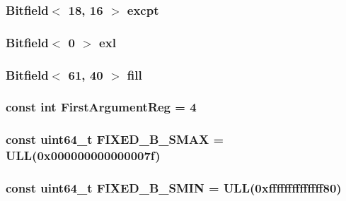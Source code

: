 \label{namespaceMipsISA_af82a5b4961c19deb1c31c3e7caf815f0}
\hypertarget{namespaceMipsISA_a58c4c329e72fc28d6945a399bb0ccbc3}{
\subsubsection[{excpt}]{\setlength{\rightskip}{0pt plus 5cm}Bitfield$<$ 18, 16 $>$ {\bf excpt}}}
\label{namespaceMipsISA_a58c4c329e72fc28d6945a399bb0ccbc3}
\hypertarget{namespaceMipsISA_a6e38f8e879fe70aca77ab90389d39e97}{
\subsubsection[{exl}]{\setlength{\rightskip}{0pt plus 5cm}Bitfield$<$ 0 $>$ {\bf exl}}}
\label{namespaceMipsISA_a6e38f8e879fe70aca77ab90389d39e97}
\hypertarget{namespaceMipsISA_a95b18420f1d84cd2e568f274679db425}{
\subsubsection[{fill}]{\setlength{\rightskip}{0pt plus 5cm}Bitfield$<$ 61, 40 $>$ {\bf fill}}}
\label{namespaceMipsISA_a95b18420f1d84cd2e568f274679db425}
\hypertarget{namespaceMipsISA_aa197a357910726362c5838276505451c}{
\subsubsection[{FirstArgumentReg}]{\setlength{\rightskip}{0pt plus 5cm}const int {\bf FirstArgumentReg} = 4}}
\label{namespaceMipsISA_aa197a357910726362c5838276505451c}
\hypertarget{namespaceMipsISA_aca960655cd1d092ded4a00e0cfe242f5}{
\subsubsection[{FIXED\_\-B\_\-SMAX}]{\setlength{\rightskip}{0pt plus 5cm}const uint64\_\-t {\bf FIXED\_\-B\_\-SMAX} = ULL(0x000000000000007f)}}
\label{namespaceMipsISA_aca960655cd1d092ded4a00e0cfe242f5}
\hypertarget{namespaceMipsISA_a4e61092133665f4dee5dc4f839b9b3c0}{
\subsubsection[{FIXED\_\-B\_\-SMIN}]{\setlength{\rightskip}{0pt plus 5cm}const uint64\_\-t {\bf FIXED\_\-B\_\-SMIN} = ULL(0xffffffffffffff80)}}
